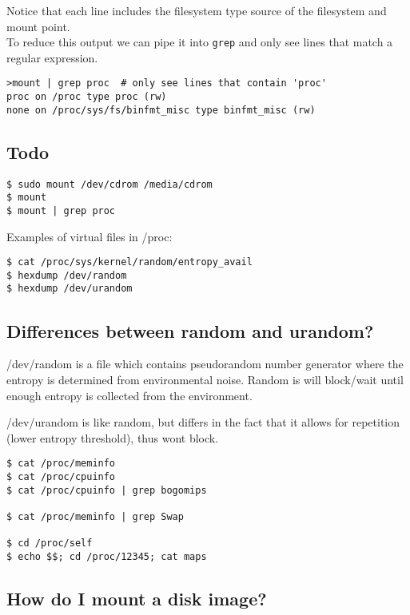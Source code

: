 Notice that each line includes the filesystem type source of the
filesystem and mount point.\\To reduce this output we can pipe it into
\texttt{grep} and only see lines that match a regular expression.

\begin{verbatim}
>mount | grep proc  # only see lines that contain 'proc'
proc on /proc type proc (rw)
none on /proc/sys/fs/binfmt_misc type binfmt_misc (rw)
\end{verbatim}

\subsection{Todo}\label{todo}

\begin{verbatim}
$ sudo mount /dev/cdrom /media/cdrom
$ mount
$ mount | grep proc
\end{verbatim}

Examples of virtual files in /proc:

\begin{verbatim}
$ cat /proc/sys/kernel/random/entropy_avail
$ hexdump /dev/random
$ hexdump /dev/urandom
\end{verbatim}

\subsection{Differences between random and
urandom?}\label{differences-between-random-and-urandom}

/dev/random is a file which contains pseudorandom number generator where
the entropy is determined from environmental noise. Random is will
block/wait until enough entropy is collected from the environment.

/dev/urandom is like random, but differs in the fact that it allows for
repetition (lower entropy threshold), thus wont block.

\begin{verbatim}
$ cat /proc/meminfo
$ cat /proc/cpuinfo
$ cat /proc/cpuinfo | grep bogomips

$ cat /proc/meminfo | grep Swap

$ cd /proc/self
$ echo $$; cd /proc/12345; cat maps
\end{verbatim}

\subsection{How do I mount a disk
image?}\label{how-do-i-mount-a-disk-image}

